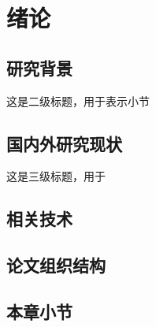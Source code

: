 \chapter{绪论}
\section{研究背景}

这是二级标题，用于表示小节

\section{国内外研究现状}

这是三级标题，用于

\section{相关技术}

\section{论文组织结构}

\section{本章小节}